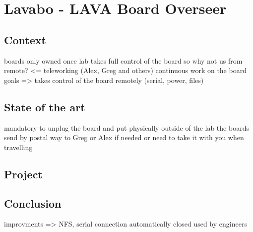\chapter{Lavabo - LAVA Board Overseer}

\section{Context}
boards only owned once
lab takes full control of the board so why not us from remote? <= teleworking (Alex, Greg and others)
continuous work on the board
goals => takes control of the board remotely (serial, power, files)

\section{State of the art}
mandatory to unplug the board and put physically outside of the lab the boards
send by postal way to Greg or Alex if needed or need to take it with you when travelling

\section{Project}

\section{Conclusion}
improvments => NFS, serial connection automatically closed
used by engineers
